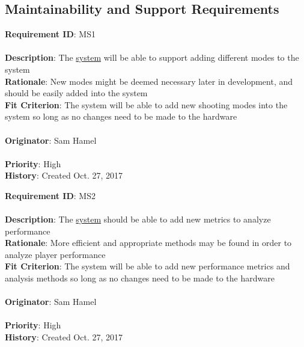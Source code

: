 \documentclass[11pt]{article}
\begin{document}
\subsection{Maintainability and Support Requirements}
\begin{framed}
	\noindent\textbf{Requirement ID}: MS1 \\\\
	\noindent\textbf{Description}: The \hyperref[sec:definitions]{system} will be able to support adding different modes to the system\\
	\textbf{Rationale}: New modes might be deemed necessary later in development, and should be easily added into the system \\
	\textbf{Fit Criterion}: The system will be able to add new shooting modes into the system so long as no changes need to be made to the hardware \\\\
	\textbf{Originator}: Sam Hamel \\\\
	\textbf{Priority}: High \hfill \\
	\noindent\textbf{History}: Created Oct. 27, 2017
\end{framed}

\begin{framed}
	\noindent\textbf{Requirement ID}: MS2 \\\\
	\noindent\textbf{Description}: The \hyperref[sec:definitions]{system} should be able to add new metrics to analyze performance\\
	\textbf{Rationale}: More efficient and appropriate methods may be found in order to analyze player performance\\
	\textbf{Fit Criterion}: The system will be able to add new performance metrics and analysis methods so long as no changes need to be made to the hardware\\\\
	\textbf{Originator}: Sam Hamel \\\\
	\textbf{Priority}: High \hfill \\
	\noindent\textbf{History}: Created Oct. 27, 2017
\end{framed}
\end{document}
